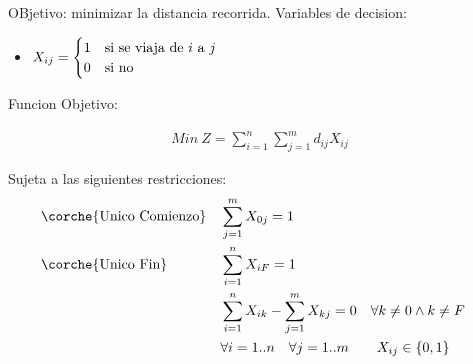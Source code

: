 \begin{homeworkProblem}
OBjetivo: minimizar la distancia recorrida.
Variables de decision:
\begin{itemize}
    \item $
        X_{ij} =
        \begin{cases}
            1   &\mbox{\text{si se viaja de $i$ a $j$}} \\
            0   &\mbox{\text{si no}}
        \end{cases}
    $
\end{itemize}

Funcion Objetivo:

\begin{align*}
    Min\ Z = \sum_{i=1}^{n}{\sum_{j=1}^{m}{d_{ij}X_{ij}}}
\end{align*}

Sujeta a las siguientes restricciones:
\begin{align*}
    &\corche{\text{Unico Comienzo}}& &\sum_{j=1}^{m}{X_{0j}}=1& \\
    &\corche{\text{Unico Fin}}& &\sum_{i=1}^{n}{X_{iF}}=1& \\
    && &\sum_{i=1}^{n}{X_{ik}}-\sum_{j=1}^{m}{X_{kj}}=0 \quad \forall k \neq 0 \wedge k \neq F      &\\
    && &\forall i=1..n \quad \forall j=1..m \quad\quad X_{ij}\in \left\{0,1\right\}&
\end{align*}

\end{homeworkProblem}